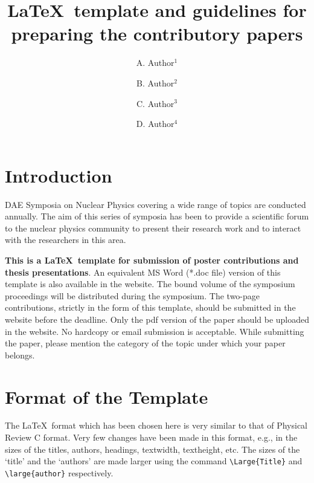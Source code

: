 \documentclass[twocolumn,amsmath,amssymb]{snp}
\begin{document}
\title{{\Large \LaTeX\ template and guidelines for preparing the contributory papers}}%

\author{\large A. Author$^1$}
\author{\large B. Author$^2$}
\author{\large C. Author$^3$}
\author{\large D. Author$^4$}%
\maketitle


\section*{Introduction}
DAE Symposia on Nuclear Physics covering a wide range of topics \cite{poster} are conducted annually. The aim of this series of symposia has been to provide a scientific forum to the nuclear physics community to present their research work and to interact with the researchers in this area. 

{\bf This is a \LaTeX\ template for submission of poster contributions and thesis presentations}. 
An equivalent MS Word (*.doc file) version of this template 
is also available in the website.  
The bound volume of the 
symposium proceedings \cite{dae} will be distributed during the symposium. The two-page contributions, strictly in 
the form of this template, should be submitted in the website before the deadline.  Only the pdf version of the paper should be uploaded in the website. No hardcopy or email submission is acceptable. While submitting the paper, please mention the category of the topic 
under which your paper belongs.


\section*{Format of the Template}
The \LaTeX\ format which has been chosen here is very similar to that of Physical Review C format. Very few changes 
have been made in this format, e.g., in the sizes of the titles, authors, headings, textwidth, textheight, etc.
The sizes of the `title' and the `authors' are made larger using the command \verb+\Large{Title}+ and \verb+\large{author}+ respectively.
\end{document}
